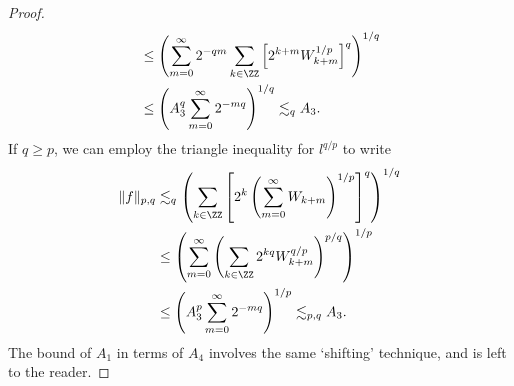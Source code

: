 \begin{proof}
\begin{align*}
        &\leq \left( \sum_{m = 0}^\infty 2^{-qm} \sum_{k \in \ZZ} \left[ 2^{k+m} W_{k+m}^{1/p} \right]^q \right)^{1/q}\\
        &\leq \left( A_3^q \sum_{m = 0}^\infty 2^{-mq} \right)^{1/q} \lesssim_q A_3.
    \end{align*}
    If $q \geq p$, we can employ the triangle inequality for $l^{q/p}$ to write
    \begin{align*}
        \| f \|_{p,q} &\lesssim_q \left( \sum_{k \in \ZZ} \left[2^k \left( \sum_{m = 0}^\infty W_{k + m}  \right)^{1/p} \right]^q \right)^{1/q}\\
        &\leq \left( \sum_{m = 0}^\infty \left( \sum_{k \in \ZZ} 2^{kq} W_{k+m}^{q/p} \right)^{p/q} \right)^{1/p}\\
        &\leq \left( A_3^p \sum_{m = 0}^\infty 2^{-mq} \right)^{1/p} \lesssim_{p,q} A_3.
    \end{align*}
    The bound of $A_1$ in terms of $A_4$ involves the same `shifting' technique, and is left to the reader.
\end{proof}

